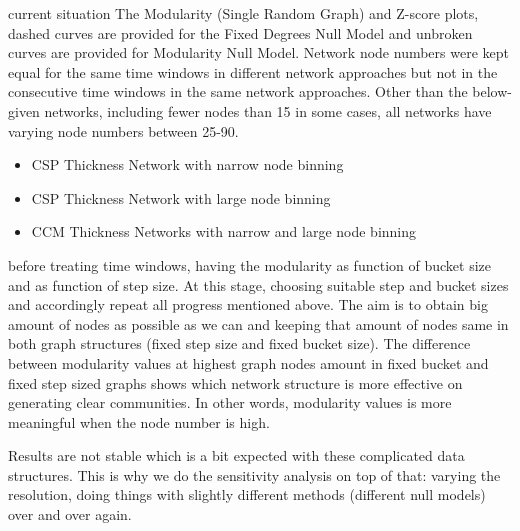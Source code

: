 {	
	current situation
	The Modularity (Single Random Graph) and Z-score plots, dashed curves are provided for the Fixed Degrees Null Model and unbroken curves are provided for Modularity Null Model.
	Network node numbers were kept equal for the same time windows in different network approaches but not in the consecutive time windows in the same network approaches.
	Other than the below-given networks, including fewer nodes than 15 in some cases, all networks have varying node numbers between 25-90.
	\begin{itemize}
		\item CSP Thickness Network with narrow node binning
		\item CSP Thickness Network with large node binning
		\item CCM Thickness Networks with narrow and large node binning
	\end{itemize}

before treating time windows, having the modularity as function of bucket size and as function of step size. At this stage, choosing suitable step and bucket sizes and accordingly repeat all progress mentioned above. The aim is to obtain big amount of nodes as possible as we can and keeping that amount of nodes same in both graph structures (fixed step size and fixed bucket size). The difference between modularity values at highest graph nodes amount in fixed bucket and fixed step sized graphs shows which network structure is more effective on generating clear communities. In other words, modularity values is more meaningful when the node number is high.

Results are not stable which is a bit expected with these complicated data structures. This is why we do the sensitivity analysis on top of that: varying the resolution, doing things with slightly different methods (different null models) over and over again. 
}


